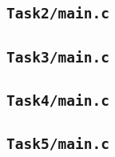 \subsection{\texttt{Task2/main.c}}
%

\subsection{\texttt{Task3/main.c}}
%

\subsection{\texttt{Task4/main.c}}
%

\subsection{\texttt{Task5/main.c}}
%



